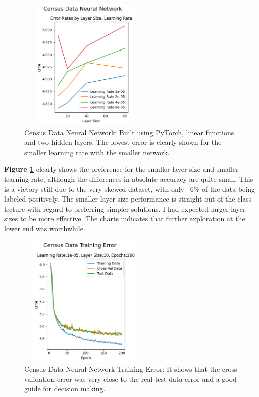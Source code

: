 \documentclass[letterpaper]{article} %
\begin{document}
\begin{figure}[h]
\centering
\includegraphics[width=2.5in, height=2.5in]{figures/Census_Data_Neural_Network_Error_Rates_by_Layer_Size__Learning_Rate_census.png}
\caption{Census Data Neural Network:  Built using PyTorch, linear functions and two hidden layers.  The lowest error is clearly shown for the smaller learning rate with the smaller network.   }
\label{fig:census_neural_network_start}
\end{figure}

\textbf{Figure \ref{fig:census_neural_network_start}} clearly shows the preference for the smaller layer size and smaller learning rate, although the differences in absolute accuracy are quite small.  This is a victory still due to the very skewed dataset, with only ~6\% of the data being labeled positively.  The smaller layer size performance is straight out of the class lecture with regard to preferring simpler solutions.  I had expected larger layer sizes to be more effective.  The charts indicates that further exploration at the lower end was worthwhile.

\begin{figure}[h]
\centering
\includegraphics[width=2.5in, height=2.5in]{figures/Census_Data_Training_Error_Learning_Rate_chart_one.png}
\caption{Census Data Neural Network Training Error:  It shows that the cross validation error was very close to the real test data error and a good guide for decision making.  }
\label{fig:census_neural_network_error}
\end{figure}
\end{document}
